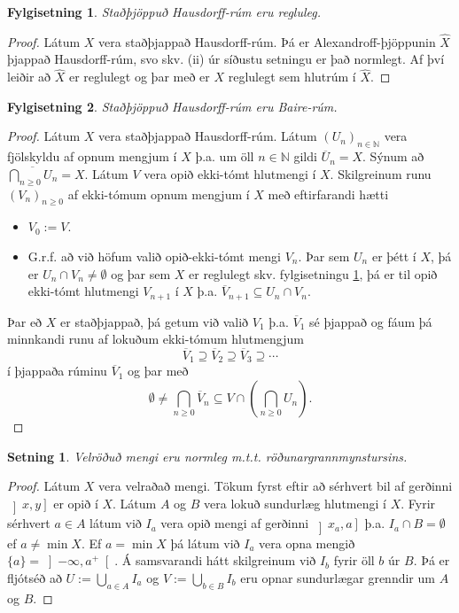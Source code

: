 \documentclass[a4paper,icelandic]{book}
\theoremstyle{definition}
\theoremstyle{plain}
\newtheorem{setn}{Setning}[section]
\newtheorem{fylgisetn}{Fylgisetning}[section]
\theoremstyle{remark}
\newcommand{\N}{\mathbb{N}} %
\begin{document}
\begin{fylgisetn}\label{fylgisetn:regluleg_hausdorff}
  Staðþjöppuð Hausdorff-rúm eru regluleg. 
\end{fylgisetn}
\begin{proof}
  Látum $X$ vera staðþjappað Hausdorff-rúm. Þá er Alexandroff-þjöppunin
  $\hat X$ þjappað Hausdorff-rúm, svo skv. (ii) úr síðustu setningu er
  það normlegt. Af því leiðir að $\hat X$ er reglulegt og þar með er $X$
  reglulegt sem hlutrúm í $\hat X$.
\end{proof}
\begin{fylgisetn}
  Staðþjöppuð Hausdorff-rúm eru Baire-rúm.
\end{fylgisetn}
\begin{proof}
  Látum $X$ vera staðþjappað Hausdorff-rúm. Látum $(U_n)_{n\in\N}$ vera
  fjölskyldu af opnum mengjum í $X$ þ.a. um öll $n\in\N$ gildi
  $\overline U_n = X$. Sýnum að $\overline{\bigcap_{n\geq 0}U_n}=X$.
  Látum $V$ vera opið ekki-tómt hlutmengi í $X$. Skilgreinum runu
  $(V_n)_{n\geq 0}$ af ekki-tómum opnum mengjum í $X$ með eftirfarandi
  hætti
  \begin{itemize}
    \item $V_0 := V$.
    \item G.r.f. að við höfum valið opið-ekki-tómt mengi $V_n$. Þar sem
      $U_n$ er þétt í $X$, þá er $U_n\cap V_n\neq\emptyset$ og þar sem
      $X$ er reglulegt skv. fylgisetningu
      \ref{fylgisetn:regluleg_hausdorff}, þá er til opið ekki-tómt
      hlutmengi $V_{n+1}$ í $X$ þ.a. $\overline V_{n+1} \subseteq
      U_n\cap V_n$.
  \end{itemize}
  Þar eð $X$ er staðþjappað, þá getum við valið $V_1$ þ.a. $\overline
  V_1$ sé þjappað og fáum þá minnkandi runu af lokuðum ekki-tómum
  hlutmengjum \[
  \overline V_1
  \supseteq \overline V_2
  \supseteq \overline V_3
  \supseteq \cdots
  \]
  í þjappaða rúminu $\overline V_1$ og þar með\[
  \emptyset
  \neq\bigcap_{n\geq 0}\overline V_n
  \subseteq V \cap \left( \bigcap_{n\geq 0} U_n \right).
  \]
\end{proof}
\begin{setn}
  Velröðuð mengi eru normleg m.t.t. röðunargrannmynstursins.
\end{setn}
\begin{proof}
  Látum $X$ vera velraðað mengi. Tökum fyrst eftir að sérhvert bil af
  gerðinni $\left]x,y\right]$ er opið í $X$. Látum $A$ og $B$ vera lokuð
  sundurlæg hlutmengi í $X$. Fyrir sérhvert $a\in A$ látum við $I_a$
  vera opið mengi af gerðinni $\left]x_a,a\right]$ þ.a. $I_a\cap B =
  \emptyset$ ef $a\neq \min X$. Ef $a = \min X$ þá látum við $I_a$ vera
  opna mengið $\{a\}=\left]-\infty,a^+\right[$. Á samsvarandi hátt
  skilgreinum við $I_b$ fyrir öll $b$ úr $B$. Þá er fljótséð að
  $U:=\bigcup_{a\in A} I_a$ og $V:=\bigcup_{b\in B}I_b$ eru opnar
  sundurlægar grenndir um $A$ og $B$.
\end{proof}
\end{document}
